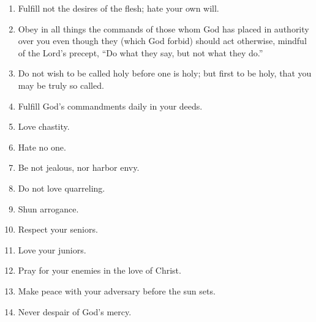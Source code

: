 \documentclass[12pt,letterpaper]{article}
\newcommand{\code}{\item}
\begin{document}
\begin{enumerate}
\code Fulfill not the desires of the flesh; hate your own will.
\code Obey in all things the commands of those whom God has placed in authority over you even though they (which God forbid) should act otherwise, mindful of the Lord's precept, ``Do what they say, but not what they do.''
\code Do not wish to be called holy before one is holy; but first to be holy, that you may be truly so called.
\code Fulfill God's commandments daily in your deeds.
\code Love chastity.
\code Hate no one.
\code Be not jealous, nor harbor envy.
\code Do not love quarreling.
\code Shun arrogance.
\code Respect your seniors.
\code Love your juniors.
\code Pray for your enemies in the love of Christ.
\code Make peace with your adversary before the sun sets.
\code Never despair of God's mercy.
\end{enumerate}
\end{document}
